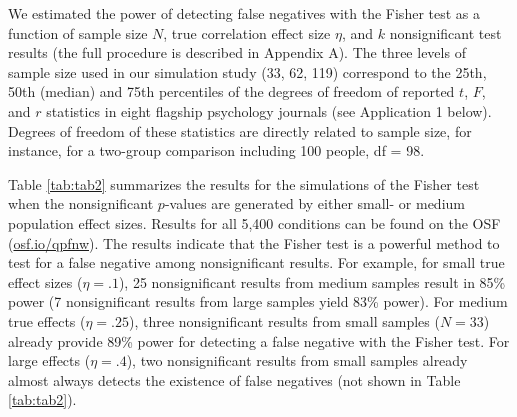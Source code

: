 \documentclass{article}
\begin{document}
We estimated the power of detecting false negatives with the Fisher test as a function of sample size $N$, true correlation effect size $\eta$, and $k$ nonsignificant test results (the full procedure is described in Appendix A). The three levels of sample size used in our simulation study (33, 62, 119) correspond to the 25th, 50th (median) and 75th percentiles of the degrees of freedom of reported $t$, $F$, and $r$ statistics in eight flagship psychology journals (see Application 1 below). Degrees of freedom of these statistics are directly related to sample size, for instance, for a two-group comparison including 100 people, df = 98. 

Table \ref{tab:tab2} summarizes the results for the simulations of the Fisher test when the nonsignificant $p$-values are generated by either small- or medium population effect sizes. Results for all 5,400 conditions can be found on the OSF (\url{osf.io/qpfnw}). The results indicate that the Fisher test is a powerful method to test for a false negative among nonsignificant results. For example, for small true effect sizes ($\eta=.1$), 25 nonsignificant results from medium samples result in 85\% power (7 nonsignificant results from large samples yield 83\% power). For medium true effects ($\eta=.25$), three nonsignificant results from small samples ($N=33$) already provide 89\% power for detecting a false negative with the Fisher test. For large effects ($\eta=.4$), two nonsignificant results from small samples already almost always detects the existence of false negatives (not shown in Table \ref{tab:tab2}).
\end{document}
